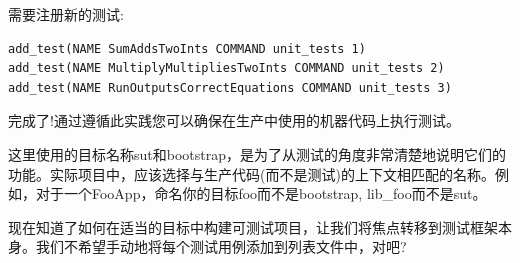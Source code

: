 需要注册新的测试:

\begin{lstlisting}[style=styleCMake]
add_test(NAME SumAddsTwoInts COMMAND unit_tests 1)
add_test(NAME MultiplyMultipliesTwoInts COMMAND unit_tests 2)
add_test(NAME RunOutputsCorrectEquations COMMAND unit_tests 3)
\end{lstlisting} 

完成了!通过遵循此实践您可以确保在生产中使用的机器代码上执行测试。

\begin{tcolorbox}[colback=blue!5!white,colframe=blue!75!black,title=Note]
这里使用的目标名称sut和bootstrap，是为了从测试的角度非常清楚地说明它们的功能。实际项目中，应该选择与生产代码(而不是测试)的上下文相匹配的名称。例如，对于一个FooApp，命名你的目标foo而不是bootstrap, lib\_foo而不是sut。
\end{tcolorbox}

现在知道了如何在适当的目标中构建可测试项目，让我们将焦点转移到测试框架本身。我们不希望手动地将每个测试用例添加到列表文件中，对吧?
































